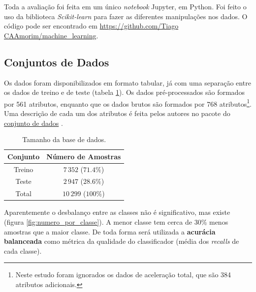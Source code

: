 \documentclass[final,5p]{elsarticle}
\numberwithin{equation}{section}
\begin{document}
    Toda a avaliação foi feita em um único \emph{notebook} Jupyter, em Python. Foi feito o uso da biblioteca \emph{Scikit-learn} \cite{scikit-learn} para fazer as diferentes manipulações nos dados. O código pode ser encontrado em \href{https://github.com/TiagoCAAmorim/machine_learning/blob/main/Lista02/Lista02.ipynb}{https://github.com/Tiago CAAmorim/machine\_learning}.

    \subsection{Conjuntos de Dados}

        Os dados foram disponibilizados em formato tabular, já com uma separação entre os dados de treino e de teste (tabela \ref{tab:total_dados}). Os dados pré-processados são formados por 561 atributos, enquanto que os dados brutos são formados por 768 atributos\footnote{Neste estudo foram ignorados os dados de aceleração total, que são 384 atributos adicionais.}. Uma descrição de cada um dos atributos é feita pelos autores no pacote do \href{https://github.com/TiagoCAAmorim/machine_learning/blob/main/Lista02/UCI_HAR_Dataset/features_info.txt}{conjunto de dados} \cite{anguita2013public}.
        \begin{table}[h]
            \centering
            \begin{tabular}{c c}
                \toprule
                \textbf{Conjunto} & \textbf{Número de Amostras} \\
                \midrule
                Treino & $7\,352$ ($71.4\%$) \\
                Teste & $2\,947$ ($28.6\%$) \\
                \addlinespace
                Total & $10\,299$ ($100\%$)\\
                \bottomrule
            \end{tabular}
            \caption{Tamanho da base de dados.}
            \label{tab:total_dados}
        \end{table}

        Aparentemente o desbalanço entre as classes não é significativo, mas existe (figura \ref{fig:numero_por_classe}). A menor classe tem cerca de 30\% menos amostras que a maior classe. De toda forma será utilizada a \textbf{acurácia balanceada} como métrica da qualidade do classificador (média dos \emph{recalls} de cada classe).
\end{document}
